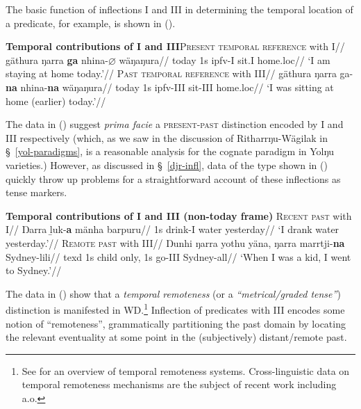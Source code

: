 The basic function of inflections \gls{I} and \gls{III} in determining the temporal location of a predicate, for example, is shown in (\nextx).

\pex{}\textbf{Temporal contributions of \gls{I} and \gls{III}}\a{}\begingl\glpreamble \textsc{Present temporal reference} with \gls{I}//
\gla gäthura ŋarra \textbf{ga} nhina-$\boldsymbol\varnothing$ wäŋaŋura//
\glb today 1s \gls{ipfv}-\gls{I} sit.\gls{I} home.\gls{loc}//
\glft`I am staying at home today.'//
\endgl
\a{}\begingl\glpreamble\textsc{Past temporal reference} with \gls{III}//
\gla gäthura ŋarra ga-\textbf{na} nhina-\textbf{na} wäŋaŋura//
\glb today 1s \gls{ipfv}-\gls{III} sit-\gls{III} home.\gls{loc}//
\glft`I was sitting at home (earlier) today.'//
\endgl
\xe

The data in () suggest \textit{prima facie} a \textsc{present-past} distinction encoded by \gls{I} and \gls{III} respectively (which, as we saw in the discussion of Ritharrŋu-Wägilak in \S~\ref{yol-paradigms}, is a reasonable analysis for the cognate paradigm in Yolŋu varieties.) However, as discussed in \S~\ref{djr-infl}, data of the type shown in (\nextx) quickly throw up problems for a straightforward account of these inflections as tense markers.

\pex \textbf{Temporal contributions of \gls{I} and \gls{III} (non-today frame)}
\a{}\begingl\glpreamble\textsc{Recent past} with \gls{I}//
\gla Ŋarra ḻuk-\textbf{a} mänha barpuru//
\glb 1s drink-\gls{I} water yesterday//
\glft`I drank water yesterday.'\trailingcitation{[BM~20190405]}//\endgl
\a{}\begingl\glpreamble\textsc{Remote past} with \gls{III}//
\gla Ŋunhi ŋarra yothu yäna, ŋarra marrtji-\textbf{na} Sydney-lili//
\glb \gls{texd} 1s child only, 1s go-\gls{III} Sydney-\gls{all}//
\glft`When I was a kid, I went to Sydney.'\trailingcitation{[BM~20190405]}//
\endgl
\xe


The data in () show that a \textit{temporal remoteness} (or a \textit{``metrical/graded tense''}) distinction is manifested in WD.\footnote{See \citet[Ch. 4]{Comrie1985} for an overview of temporal remoteness systems. Cross-linguistic data on temporal remoteness mechanisms are the subject of recent work including \citealt{Klecha2016,Cable2013,Bohnemeyer2018,Martin2010,Hayashi2015} a.o.} Inflection of predicates with \gls{III} encodes some notion of ``remoteness'', grammatically partitioning the past domain by locating the relevant eventuality at some point in the (subjectively) distant/remote past.


